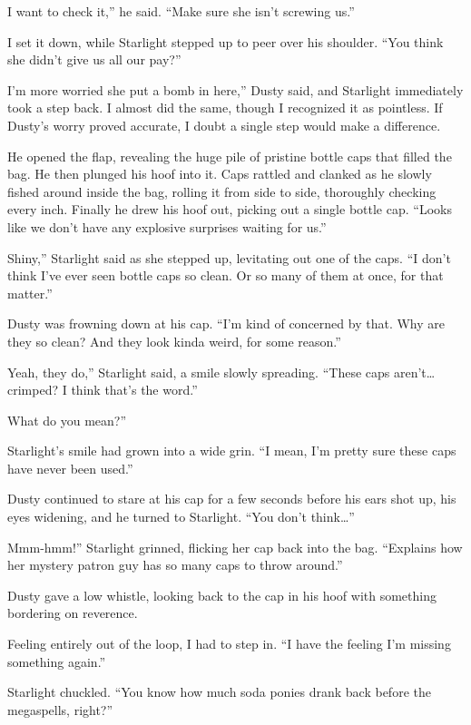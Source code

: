 \leavevmode{}I want to check it,” he said. “Make sure she isn’t screwing us.”

I set it down, while Starlight stepped up to peer over his shoulder. “You think she didn’t give us all our pay?”

\leavevmode{}I’m more worried she put a bomb in here,” Dusty said, and Starlight immediately took a step back. I almost did the same, though I recognized it as pointless. If Dusty’s worry proved accurate, I doubt a single step would make a difference.

He opened the flap, revealing the huge pile of pristine bottle caps that filled the bag. He then plunged his hoof into it. Caps rattled and clanked as he slowly fished around inside the bag, rolling it from side to side, thoroughly checking every inch. Finally he drew his hoof out, picking out a single bottle cap. “Looks like we don’t have any explosive surprises waiting for us.”

\leavevmode{}Shiny,” Starlight said as she stepped up, levitating out one of the caps. “I don’t think I’ve ever seen bottle caps so clean. Or so many of them at once, for that matter.”

Dusty was frowning down at his cap. “I’m kind of concerned by that. Why are they so clean? And they look kinda weird, for some reason.”

\leavevmode{}Yeah, they do,” Starlight said, a smile slowly spreading. “These caps aren’t… crimped? I think that’s the word.”

\leavevmode{}What do you mean?”

Starlight’s smile had grown into a wide grin. “I mean, I’m pretty sure these caps have never been used.”

Dusty continued to stare at his cap for a few seconds before his ears shot up, his eyes widening, and he turned to Starlight. “You don’t think…”

\leavevmode{}Mmm-hmm!” Starlight grinned, flicking her cap back into the bag. “Explains how her mystery patron guy has so many caps to throw around.”

Dusty gave a low whistle, looking back to the cap in his hoof with something bordering on reverence.

Feeling entirely out of the loop, I had to step in. “I have the feeling I’m missing something again.”

Starlight chuckled. “You know how much soda ponies drank back before the megaspells, right?”

